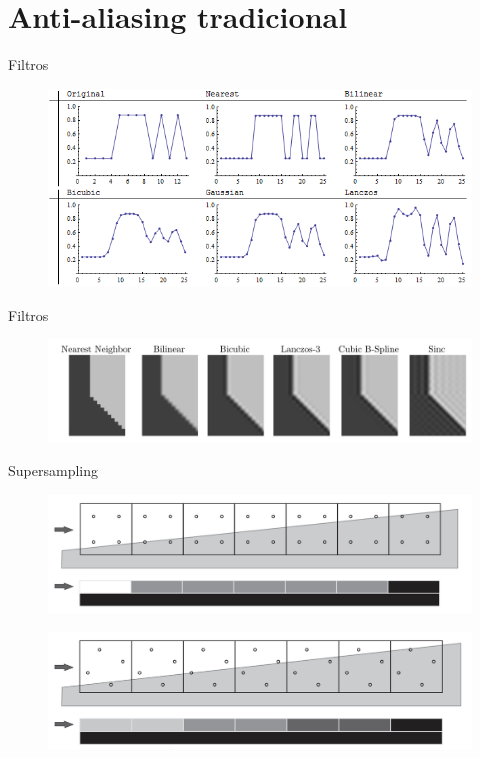 \documentclass[table]{beamer}
\begin{document}
\section{Anti-aliasing tradicional}

\begin{frame}[fragile]{Filtros}
    \begin{figure}
        \includegraphics[width=\linewidth]{./figures/Lw6ei.png}
    \end{figure}
\end{frame}

\begin{frame}[fragile]{Filtros}
    \begin{figure}
        \includegraphics[width=\linewidth]{./figures/comparison-filter.png}
    \end{figure}
\end{frame}

\begin{frame}[fragile]{Supersampling}
    \begin{figure}
        \includegraphics[width=\linewidth]{./figures/ogss.png}
    \end{figure}
    \begin{figure}
        \includegraphics[width=\linewidth]{./figures/rgss.png}
    \end{figure}
\end{frame}
\end{document}
